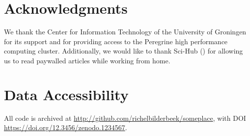 % 
% 

\section{Acknowledgments}

We thank the Center for Information Technology of the University 
of Groningen for its support and for providing access to the Peregrine 
high performance computing cluster. 
Additionally, we would like to thank Sci-Hub (\cite{himmelstein2018sci})
for allowing us to read paywalled articles while working from home.

\section{Data Accessibility}

All code is archived at \url{http://github.com/richelbilderbeek/someplace},
with DOI \url{https://doi.org/12.3456/zenodo.1234567}.

